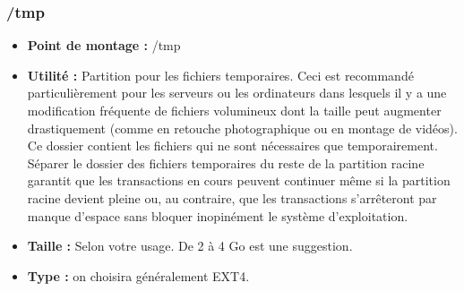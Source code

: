 \begin{frame}[containsverbatim]
	\frametitle{/tmp}
	\begin{itemize}
		\item  \textbf{Point de montage :} /tmp
		\item \textbf{Utilité :} Partition pour les fichiers temporaires.
		Ceci est recommandé particulièrement pour les serveurs ou les ordinateurs dans lesquels il y a une modification fréquente de fichiers volumineux dont la taille peut augmenter drastiquement (comme en retouche photographique ou en montage de vidéos). Ce dossier contient les fichiers qui ne sont nécessaires que temporairement. Séparer le dossier des fichiers temporaires du reste de la partition racine garantit que les transactions en cours peuvent continuer même si la partition racine devient pleine ou, au contraire, que les transactions s'arrêteront par manque d'espace sans bloquer inopinément le système d'exploitation.
		\item \textbf{Taille :} Selon votre usage. De 2 à 4 Go est une suggestion.
		\item \textbf{Type : } on choisira généralement EXT4.
	\end{itemize}
\end{frame}
